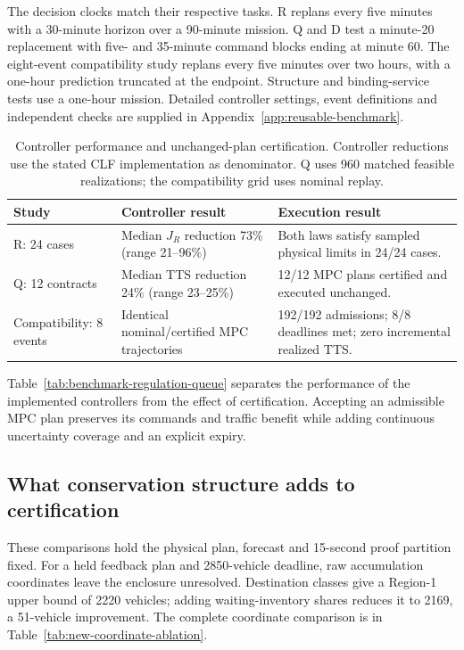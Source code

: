 \documentclass[journal,10pt]{IEEEtran}
\newcommand{\appref}[1]{Appendix~\ref{#1}}
\begin{document}
The decision clocks match their respective tasks. R replans every five
minutes with a 30-minute horizon over a 90-minute mission. Q and D test a
minute-20 replacement with five- and 35-minute command blocks ending at
minute 60. The eight-event compatibility study replans every five minutes
over two hours, with a one-hour prediction truncated at the endpoint.
Structure and binding-service tests use a one-hour mission. Detailed
controller settings, event definitions and independent checks are supplied
in \appref{app:reusable-benchmark}.

\begin{table}[t]
\centering\small
\caption{Controller performance and unchanged-plan certification. Controller
reductions use the stated CLF implementation as denominator. Q uses 960
matched feasible realizations; the compatibility grid uses nominal replay.}
\label{tab:benchmark-regulation-queue}
\label{tab:eight-event-compatibility-summary}
\begin{tabular}{@{}p{}p{}p{}@{}}
\toprule
Study & Controller result & Execution result\\
\midrule
R: 24 cases & Median $J_R$ reduction 73\% (range 21--96\%) & Both laws satisfy sampled physical limits in 24/24 cases.\\
Q: 12 contracts & Median TTS reduction 24\% (range 23--25\%) & 12/12 MPC plans certified and executed unchanged.\\
Compatibility: 8 events & Identical nominal/certified MPC trajectories & 192/192 admissions; 8/8 deadlines met; zero incremental realized TTS.\\
\bottomrule
\end{tabular}
\end{table}

Table~\ref{tab:benchmark-regulation-queue} separates the performance of the
implemented controllers from the effect of certification. Accepting an
admissible MPC plan preserves its commands and traffic benefit while adding
continuous uncertainty coverage and an explicit expiry.

\subsection{What conservation structure adds to certification}
\label{sec:structure-results}
\label{sec:new-mpc-results}
\label{sec:structure-online}
\label{sec:network-transfer-results}

These comparisons hold the physical plan, forecast and 15-second proof
partition fixed. For a held feedback plan and 2850-vehicle deadline, raw
accumulation coordinates leave the enclosure unresolved. Destination classes
give a Region-1 upper bound of 2220 vehicles; adding waiting-inventory shares
reduces it to 2169, a 51-vehicle improvement. The complete coordinate
comparison is in Table~\ref{tab:new-coordinate-ablation}.
\end{document}
